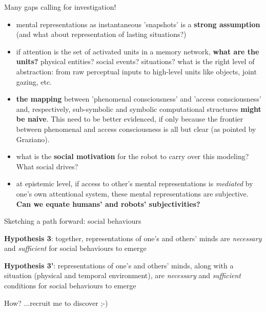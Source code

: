 \documentclass[compress]{beamer}
\begin{document}

\begin{frame}{Many gaps calling for investigation!}

\footnotesize
    \begin{itemize}

        \item<+-> mental representations as instantaneous 'snapshots' is a {\bf strong
            assumption} (and what about representation of lasting situations?)

        \item<+-> if attention is the set of activated units in a memory network,
            {\bf what are the units?} physical entities? social events? situations?
            what is the right level of abstraction: from raw perceptual inputs to
            high-level units like objects, joint gazing, etc.


        \item<+-> {\bf the mapping} between 'phenomenal consciousness' and
            'access consciousness' and, respectively, sub-symbolic and symbolic
            computational structures {\bf might be naive}. This need to be
            better evidenced, if only because the frontier between phenomenal
            and access consciousness is all but clear (as pointed by Graziano).

        \item<+-> what is the {\bf social motivation} for the robot to carry
            over this modeling? What social drives?

        \item<+-> at epistemic level, if access to other's mental
            representations is \emph{mediated} by one's own attentional system,
            these mental representations are subjective. {\bf Can we equate humans'
            and robots' subjectivities?}

    \end{itemize}

\end{frame}


\begin{frame}{Sketching a path forward: social behaviours}

    {\bf Hypothesis 3}: together, representations of one's and others' minds are
    \emph{necessary} and \emph{sufficient} for social behaviours to emerge

    {\bf Hypothesis 3'}: representations of one's and others' minds, along with
    a situation (physical and temporal environment), are \emph{necessary} and
    \emph{sufficient} conditions for social behaviours to emerge

    \pause

    How? ...recruit me to discover ;-)


\end{frame}
\end{document}
